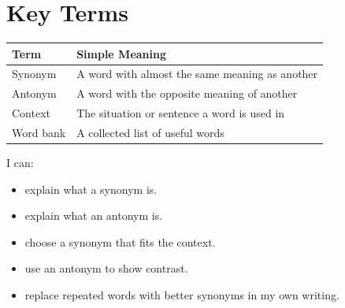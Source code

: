 \section{Key Terms}
\begin{table}[h!]
\centering
\begin{tabular}{|l|l|}
\hline
\textbf{Term} & \textbf{Simple Meaning} \\
\hline
Synonym & A word with almost the same meaning as another \\
Antonym & A word with the opposite meaning of another \\
Context & The situation or sentence a word is used in \\
Word bank & A collected list of useful words \\
\hline
\end{tabular}
\end{table}

\begin{selfcheck}
I can:
\begin{itemize}
    \item explain what a synonym is.
    \item explain what an antonym is.
    \item choose a synonym that fits the context.
    \item use an antonym to show contrast.
    \item replace repeated words with better synonyms in my own writing.
\end{itemize}
\end{selfcheck}
